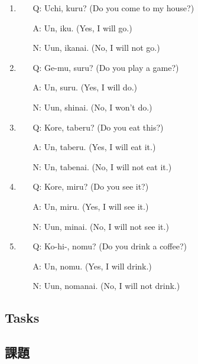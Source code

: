 \documentclass[uplatex,dvipdfmx,b5paper,english,10pt]{jsbook}
\begin{document}
\begin{enumerate}
\item 
\begin{itemize}
  \item [Q:] Uchi, kuru? (Do you come to my house?)
  \item [A:] Un, iku. (Yes, I will go.)
  \item [N:] Uun, ikanai. (No, I will not go.)
\end{itemize}
\item 
\begin{itemize}
  \item [Q:] Ge-mu, suru? (Do you play a game?)
  \item [A:] Un, suru. (Yes, I will do.)
  \item [N:] Uun, shinai. (No, I won't do.)
\end{itemize}
\item
\begin{itemize}
  \item [Q:] Kore, taberu? (Do you eat this?)
  \item [A:] Un, taberu. (Yes, I will eat it.)
  \item [N:] Un, tabenai. (No, I will not eat it.)
\end{itemize}
\item  
\begin{itemize}
  \item [Q:] Kore, miru? (Do you see it?)
  \item [A:] Un, miru. (Yes, I will see it.)
  \item [N:] Uun, minai. (No, I will not see it.)
\end{itemize}
\item 
\begin{itemize}
  \item [Q:] Ko-hi-, nomu? (Do you drink a coffee?)
  \item [A:] Un, nomu. (Yes, I will drink.)
  \item [N:] Uun, nomanai. (No, I will not drink.)
\end{itemize}
\end{enumerate}

\ifEnglish
\subsection{Tasks}
\else
\subsection{課題}
\fi
\end{document}
